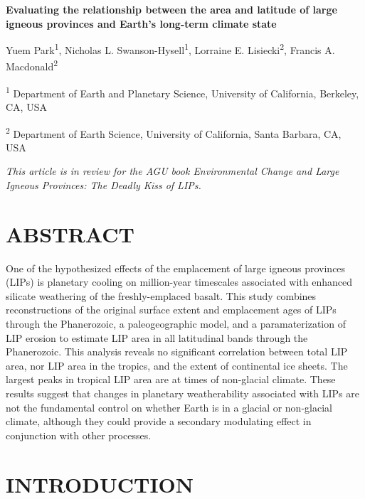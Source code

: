 \documentclass[11pt,letterpaper]{article}
\begin{document}
\begin{flushleft}
{\Large \textbf{Evaluating the relationship between the area and latitude of large igneous provinces and Earth's long-term climate state}}

Yuem Park\textsuperscript{1},
Nicholas L. Swanson-Hysell\textsuperscript{1},
Lorraine E. Lisiecki\textsuperscript{2},
Francis A. Macdonald\textsuperscript{2}

\bigskip
\textsuperscript{1} Department of Earth and Planetary Science, University of California, Berkeley, CA, USA

\textsuperscript{2} Department of Earth Science, University of California, Santa Barbara, CA, USA
\bigskip

\end{flushleft}

\noindent\textit{This article is in review for the AGU book \textit{Environmental Change and Large Igneous Provinces: The Deadly Kiss of LIPs}.}

\linenumbers

\section*{ABSTRACT \label{sec:ABSTRACT}}

One of the hypothesized effects of the emplacement of large igneous provinces (LIPs) is planetary cooling on million-year timescales associated with enhanced silicate weathering of the freshly-emplaced basalt. This study combines reconstructions of the original surface extent and emplacement ages of LIPs through the Phanerozoic, a paleogeographic model, and a paramaterization of LIP erosion to estimate LIP area in all latitudinal bands through the Phanerozoic. This analysis reveals no significant correlation between total LIP area, nor LIP area in the tropics, and the extent of continental ice sheets. The largest peaks in tropical LIP area are at times of non-glacial climate. These results suggest that changes in planetary weatherability associated with LIPs are not the fundamental control on whether Earth is in a glacial or non-glacial climate, although they could provide a secondary modulating effect in conjunction with other processes.

\section*{INTRODUCTION \label{sec:INTRODUCTION}}
\end{document}
